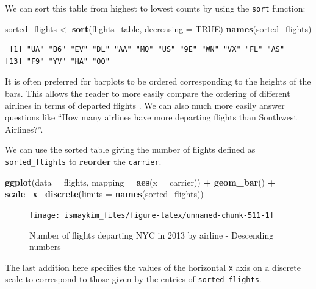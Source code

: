 \documentclass[12pt,]{krantz}
\makeatletter
\newenvironment{Shaded}{\begin{snugshade}}{\end{snugshade}}
\newcommand{\KeywordTok}[1]{\textcolor[rgb]{0.27,0.27,0.27}{\textbf{#1}}}
\newcommand{\DataTypeTok}[1]{\textcolor[rgb]{0.27,0.27,0.27}{#1}}
\newcommand{\StringTok}[1]{\textcolor[rgb]{0.5,0.5,0.5}{#1}}
\newcommand{\OtherTok}[1]{\textcolor[rgb]{0.37,0.37,0.37}{#1}}
\newcommand{\OperatorTok}[1]{\textcolor[rgb]{0.43,0.43,0.43}{\textbf{#1}}}
\newcommand{\NormalTok}[1]{#1}
\newenvironment{kframe}{%
\medskip{}
\setlength{\fboxsep}{.8em}
 \def\at@end@of@kframe{}%
 \ifinner\ifhmode%
  \def\at@end@of@kframe{\end{minipage}}%
  \begin{minipage}{\columnwidth}%
 \fi\fi%
 \def\FrameCommand##1{\hskip\@totalleftmargin \hskip-\fboxsep
 \colorbox{shadecolor}{##1}\hskip-\fboxsep
     \hskip-\linewidth \hskip-\@totalleftmargin \hskip\columnwidth}%
 \MakeFramed {\advance\hsize-\width
   \@totalleftmargin\z@ \linewidth\hsize
   \@setminipage}}%
 {\par\unskip\endMakeFramed%
 \at@end@of@kframe}
\renewenvironment{Shaded}{\begin{kframe}}{\end{kframe}}
\theoremstyle{definition}
\theoremstyle{definition}
\theoremstyle{definition}
\theoremstyle{remark}
\makeatother
\begin{document}
We can sort this table from highest to lowest counts by using the
\texttt{sort} function:

\begin{Shaded}
\begin{Highlighting}[]
\NormalTok{sorted_flights <-}\StringTok{ }\KeywordTok{sort}\NormalTok{(flights_table, }\DataTypeTok{decreasing =} \OtherTok{TRUE}\NormalTok{)}
\KeywordTok{names}\NormalTok{(sorted_flights)}
\end{Highlighting}
\end{Shaded}

\begin{verbatim}
 [1] "UA" "B6" "EV" "DL" "AA" "MQ" "US" "9E" "WN" "VX" "FL" "AS"
[13] "F9" "YV" "HA" "OO"
\end{verbatim}

It is often preferred for barplots to be ordered corresponding to the
heights of the bars. This allows the reader to more easily compare the
ordering of different airlines in terms of departed flights
\citep{robbins2013}. We can also much more easily answer questions like
``How many airlines have more departing flights than Southwest
Airlines?''.

We can use the sorted table giving the number of flights defined as
\texttt{sorted\_flights} to \textbf{reorder} the \texttt{carrier}.

\begin{Shaded}
\begin{Highlighting}[]
\KeywordTok{ggplot}\NormalTok{(}\DataTypeTok{data =}\NormalTok{ flights, }\DataTypeTok{mapping =} \KeywordTok{aes}\NormalTok{(}\DataTypeTok{x =}\NormalTok{ carrier)) }\OperatorTok{+}
\StringTok{  }\KeywordTok{geom_bar}\NormalTok{() }\OperatorTok{+}
\StringTok{  }\KeywordTok{scale_x_discrete}\NormalTok{(}\DataTypeTok{limits =} \KeywordTok{names}\NormalTok{(sorted_flights))}
\end{Highlighting}
\end{Shaded}

\begin{figure}

{\centering \texttt{[image: ismaykim\_files/figure-latex/unnamed-chunk-511-1]} 

}

\caption{Number of flights departing NYC in 2013 by airline - Descending numbers}\label{fig:unnamed-chunk-511}
\end{figure}

The last addition here specifies the values of the horizontal \texttt{x}
axis on a discrete scale to correspond to those given by the entries of
\texttt{sorted\_flights}.
\end{document}
